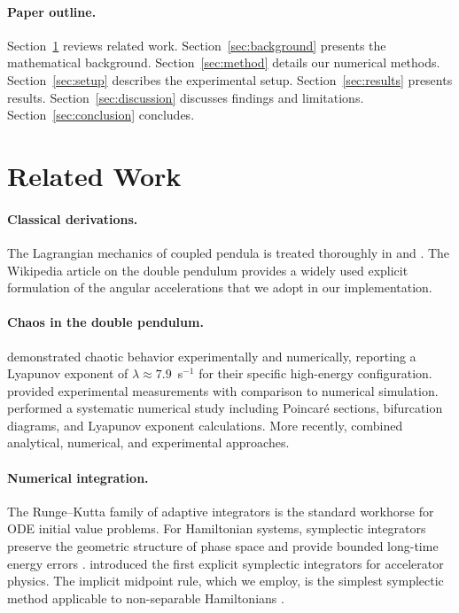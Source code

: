 \documentclass[11pt,a4paper]{article}
\begin{document}
\paragraph{Paper outline.}
Section~\ref{sec:related} reviews related work.
Section~\ref{sec:background} presents the mathematical background.
Section~\ref{sec:method} details our numerical methods.
Section~\ref{sec:setup} describes the experimental setup.
Section~\ref{sec:results} presents results.
Section~\ref{sec:discussion} discusses findings and limitations.
Section~\ref{sec:conclusion} concludes.

\section{Related Work}\label{sec:related}

\paragraph{Classical derivations.}
The Lagrangian mechanics of coupled pendula is treated thoroughly in
\citet{goldstein2002classical} and \citet{landau1976mechanics}. The
Wikipedia article on the double pendulum \citep{wikipedia_double_pendulum}
provides a widely used explicit formulation of the angular accelerations that
we adopt in our implementation.

\paragraph{Chaos in the double pendulum.}
\citet{shinbrot1992chaos} demonstrated chaotic behavior experimentally and
numerically, reporting a Lyapunov exponent of $\lambda \approx 7.9$~s$^{-1}$
for their specific high-energy configuration. \citet{levien1993double}
provided experimental measurements with comparison to numerical simulation.
\citet{stachowiak2006numerical} performed a systematic numerical study
including Poincar\'e sections, bifurcation diagrams, and Lyapunov exponent
calculations. More recently, \citet{dalessi2023analytical} combined
analytical, numerical, and experimental approaches.

\paragraph{Numerical integration.}
The Runge--Kutta family of adaptive integrators is the standard workhorse for
ODE initial value problems. For Hamiltonian systems, symplectic integrators
preserve the geometric structure of phase space and provide bounded long-time
energy errors \citep{hairer2003geometric,hairer2006geometric}. \citet{ruth1983canonical}
introduced the first explicit symplectic integrators for accelerator physics.
The implicit midpoint rule, which we employ, is the simplest symplectic method
applicable to non-separable Hamiltonians \citep{hairer2006geometric}.
\end{document}
